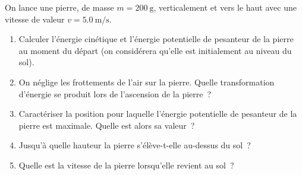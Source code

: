 On lance une pierre, de masse $m=\qty{200}{\g}$, verticalement et vers le haut
avec une vitesse de valeur $v=\qty{5.0}{\m\per\s}$.
\begin{enumerate}
    \item Calculer l'énergie cinétique et l'énergie potentielle de pesanteur de
          la pierre au moment du départ (on considérera qu'elle est initialement
          au niveau du sol).
    \item On néglige les frottements de l'air sur la pierre. Quelle
          transformation d'énergie se produit lors de l'ascension de la pierre~?
    \item Caractériser la position pour laquelle l'énergie potentielle de
          pesanteur de la pierre est maximale. Quelle est alors sa valeur~?
    \item Jusqu'à quelle hauteur la pierre s'élève-t-elle au-dessus du sol~?
    \item Quelle est la vitesse de la pierre lorsqu'elle revient au sol~?
\end{enumerate}

